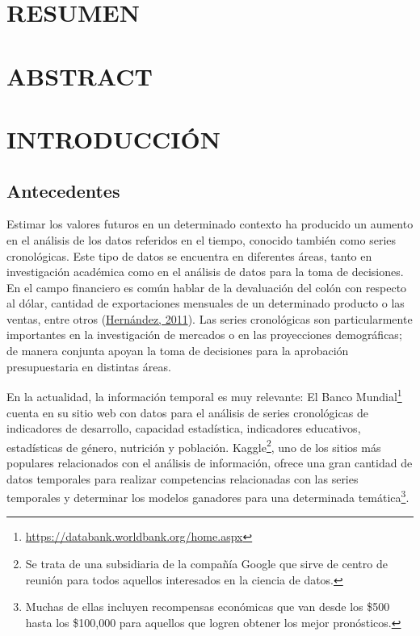 \documentclass[
]{article}
\begin{document}
\cleardoublepage

\tableofcontents
\listoftables
\listoffigures

\cleardoublepage
{}

\newpage

\section*{RESUMEN}

\cleardoublepage

\section*{ABSTRACT}

\cleardoublepage

\section{INTRODUCCIÓN}

\subsection{Antecedentes}

Estimar los valores futuros en un determinado contexto ha producido un
aumento en el análisis de los datos referidos en el tiempo, conocido
también como series cronológicas. Este tipo de datos se encuentra en
diferentes áreas, tanto en investigación académica como en el análisis
de datos para la toma de decisiones. En el campo financiero es común
hablar de la devaluación del colón con respecto al dólar, cantidad de
exportaciones mensuales de un determinado producto o las ventas, entre
otros (\protect\hyperlink{ref-oscarh-1}{Hernández, 2011}). Las series
cronológicas son particularmente importantes en la investigación de
mercados o en las proyecciones demográficas; de manera conjunta apoyan
la toma de decisiones para la aprobación presupuestaria en distintas
áreas.

En la actualidad, la información temporal es muy relevante: El Banco
Mundial\footnote{\url{https://databank.worldbank.org/home.aspx}} cuenta
en su sitio web con datos para el análisis de series cronológicas de
indicadores de desarrollo, capacidad estadística, indicadores
educativos, estadísticas de género, nutrición y población.
Kaggle\footnote{Se trata de una subsidiaria de la compañía Google que
  sirve de centro de reunión para todos aquellos interesados en la
  ciencia de datos.}, uno de los sitios más populares relacionados con
el análisis de información, ofrece una gran cantidad de datos temporales
para realizar competencias relacionadas con las series temporales y
determinar los modelos ganadores para una determinada
temática\footnote{Muchas de ellas incluyen recompensas económicas que
  van desde los \$500 hasta los \$100,000 para aquellos que logren
  obtener los mejor pronósticos.}.
\end{document}
